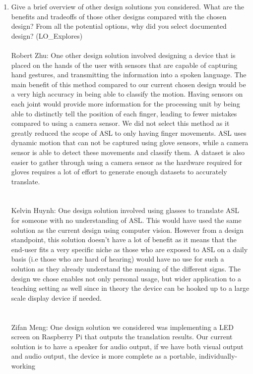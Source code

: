 \documentclass[12pt, titlepage]{article}
\begin{document}
\begin{enumerate}
  
  \item Give a brief overview of other design solutions you considered.  What
  are the benefits and tradeoffs of those other designs compared with the chosen
  design?  From all the potential options, why did you select documented design?
  (LO\_Explores)
  ~\\
  \\
  Robert Zhu: One other design solution involved designing a device that is placed on the hands of the user with sensors that are capable of capturing 
  hand gestures, and transmitting the information into a spoken language. The main benefit of this method compared to our current chosen design would 
  be a very high accuracy in being able to classify the motion. Having sensors on each joint would provide more information for the processing unit by 
  being able to distinctly tell the position of each finger, leading to fewer mistakes compared to using a camera sensor. We did not select this method 
  as it greatly reduced the scope of ASL to only having finger movements. ASL uses dynamic motion that can not be captured using glove sensors, while a 
  camera sensor is able to detect these movements and classify them. A dataset is also easier to gather through using a camera sensor as the hardware 
  required for gloves requires a lot of effort to generate enough datasets to accurately translate.
  \\
  ~\\
  \\
  Kelvin Huynh: One design solution involved using glasses to translate ASL for someone with no understanding of ASL. This would have used the same solution 
  as the current design using computer vision. However from a design standpoint, this solution doesn’t have a lot of benefit as it means that the end-user 
  fits a very specific niche as those who are exposed to ASL on a daily basis (i.e those who are hard of hearing) would have no use for such a solution as they 
  already understand the meaning of the different signs. The design we chose enables not only personal usage, but wider application to a teaching setting as 
  well since in theory the device can be hooked up to a large scale display device if needed.
  \\
  ~\\
  \\
  Zifan Meng: One design solution we considered was implementing a LED screen on Raspberry Pi that outputs the translation results. Our current solution 
  is to have a speaker for audio output, if we have both visual output and audio output, the device is more complete as a portable, individually-working 

\end{enumerate}
\end{document}

